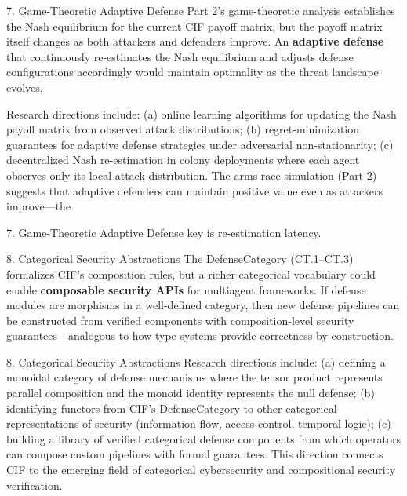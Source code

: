\documentclass[
  ignorenonframetext,
]{beamer}
\begin{document}
\begin{frame}[allowframebreaks]{7. Game-Theoretic Adaptive Defense}
\protect{}\label{game-theoretic-adaptive-defense}
Part 2's game-theoretic analysis establishes the Nash equilibrium for
the current CIF payoff matrix, but the payoff matrix itself changes as
both attackers and defenders improve. An \textbf{adaptive defense} that
continuously re-estimates the Nash equilibrium and adjusts defense
configurations accordingly would maintain optimality as the threat
landscape evolves.

Research directions include: (a) online learning algorithms for updating
the Nash payoff matrix from observed attack distributions; (b)
regret-minimization guarantees for adaptive defense strategies under
adversarial non-stationarity; (c) decentralized Nash re-estimation in
colony deployments where each agent observes only its local attack
distribution. The arms race simulation (Part 2) suggests that adaptive
defenders can maintain positive value even as attackers improve---the
\end{frame}

\begin{frame}[allowframebreaks]{7. Game-Theoretic Adaptive Defense}
key is re-estimation latency.
\end{frame}

\begin{frame}[allowframebreaks]{8. Categorical Security Abstractions}
\protect{}\label{categorical-security-abstractions}
The DefenseCategory (CT.1--CT.3) formalizes CIF's composition rules, but
a richer categorical vocabulary could enable \textbf{composable security
APIs} for multiagent frameworks. If defense modules are morphisms in a
well-defined category, then new defense pipelines can be constructed
from verified components with composition-level security
guarantees---analogous to how type systems provide
correctness-by-construction.

\end{frame}

\begin{frame}[allowframebreaks]{8. Categorical Security Abstractions}
Research directions include: (a) defining a monoidal category of defense
mechanisms where the tensor product represents parallel composition and
the monoid identity represents the null defense; (b) identifying
functors from CIF's DefenseCategory to other categorical representations
of security (information-flow, access control, temporal logic); (c)
building a library of verified categorical defense components from which
operators can compose custom pipelines with formal guarantees. This
direction connects CIF to the emerging field of categorical
cybersecurity and compositional security verification.
\end{frame}
\end{document}

